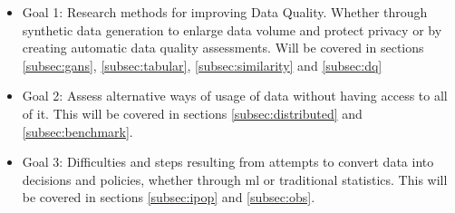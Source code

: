 \begin{itemize}
    \item Goal 1: Research methods for improving Data Quality. Whether through synthetic data generation to enlarge data volume and protect privacy or by creating automatic data quality assessments. Will be covered in sections \ref{subsec:gans}, \ref{subsec:tabular}, \ref{subsec:similarity} and \ref{subsec:dq}

    \item Goal 2: Assess alternative ways of usage of data without having access to all of it. This will be covered in sections \ref{subsec:distributed} and \ref{subsec:benchmark}.

    \item Goal 3: Difficulties and steps resulting from attempts to convert data into decisions and policies, whether through \ac{ml} or traditional statistics. This will be covered in sections \ref{subsec:ipop} and \ref{subsec:obs}.
\end{itemize}